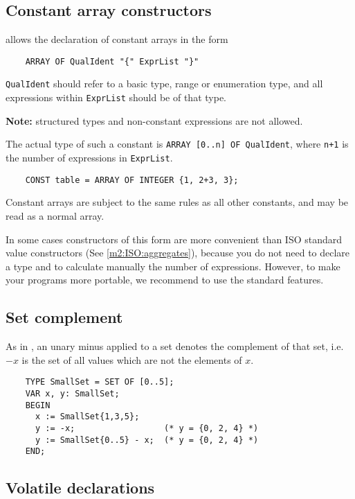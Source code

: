\subsection{Constant array constructors}\label{m2:constarrays}
\mextonly

\xds{} allows the declaration of constant arrays in the form

\verb'    ARRAY OF QualIdent "{" ExprList "}"'

{\tt QualIdent} should refer to a basic type, range or enumeration  type,  and
all expressions within {\tt ExprList} should be of that type.

{\bf Note:} structured types and non-constant expressions
are not allowed.

The actual type of such a constant is \verb|ARRAY [0..n] OF QualIdent|,
where \verb|n+1| is the number
of expressions in \verb'ExprList'.

\verb'    CONST table = ARRAY OF INTEGER {1, 2+3, 3};'

Constant arrays are subject to the same rules as all other constants,
and may be read as a normal array.

In some cases constructors of this form are more convenient than
ISO standard value constructors (See \ref{m2:ISO:aggregates}),
because you do not need to declare a type and to calculate
manually the number of expressions. However, to make your
programs more portable, we recommend to use the standard features.

\subsection{Set complement}

\mextonly

As in \ot{}, an unary minus applied to a set denotes the complement
of that set, i.e. $-x$ is the set of all values which are not the elements
of $x$.

\begin{verbatim}
    TYPE SmallSet = SET OF [0..5];
    VAR x, y: SmallSet;
    BEGIN
      x := SmallSet{1,3,5};
      y := -x;                  (* y = {0, 2, 4} *)
      y := SmallSet{0..5} - x;  (* y = {0, 2, 4} *)
    END;
\end{verbatim}


\subsection{Volatile declarations}\label{m2:ext:volatile}

